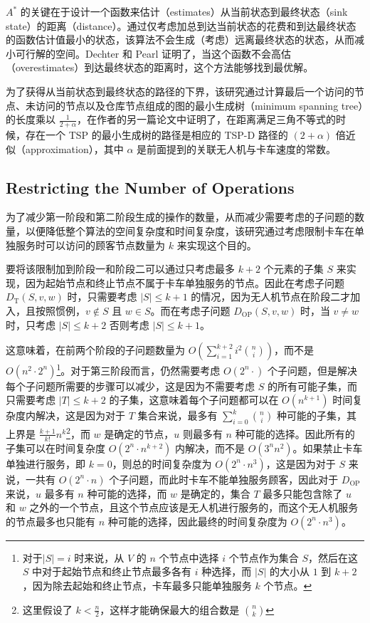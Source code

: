 \documentclass[fontset=none]{ctexart}
\begin{document}
$A^*$ 的关键在于设计一个函数来估计（estimates）从当前状态到最终状态（sink state）的距离（distance）。通过仅考虑加总到达当前状态的花费和到达最终状态的函数估计值最小的状态，该算法不会生成（考虑）远离最终状态的状态，从而减小可行解的空间。Dechter 和 Pearl \cite{dechterGeneralizedBestfirstSearch1985}证明了，当这个函数不会高估（overestimates）到达最终状态的距离时，这个方法能够找到最优解。

为了获得从当前状态到最终状态的路径的下界，该研究通过计算最后一个访问的节点、未访问的节点以及仓库节点组成的图的最小生成树（minimum spanning tree）的长度乘以 $\frac{1}{2 + \alpha}$，在作者的另一篇论文\cite{agatzOptimizationApproachesTraveling2018}中证明了，在距离满足三角不等式的时候，存在一个 TSP 的最小生成树的路径是相应的 TSP-D 路径的 $(2 + \alpha)$ 倍近似（approximation），其中 $\alpha$ 是前面提到的关联无人机与卡车速度的常数。

\subsection{Restricting the Number of Operations}

为了减少第一阶段和第二阶段生成的操作的数量，从而减少需要考虑的子问题的数量，以便降低整个算法的空间复杂度和时间复杂度，该研究通过考虑限制卡车在单独服务时可以访问的顾客节点数量为 $k$ 来实现这个目的。

要将该限制加到阶段一和阶段二可以通过只考虑最多 $k + 2$ 个元素的子集 $S$ 来实现，因为起始节点和终止节点不属于卡车单独服务的节点。因此在考虑子问题 $D_{\text{T}}(S, v, w)$ 时，只需要考虑 $\lvert S \rvert \leq k + 1$ 的情况，因为无人机节点在阶段二才加入，且按照惯例，$v \notin S$ 且 $w \in S$。而在考虑子问题 $D_{\text{OP}}(S, v, w)$ 时，当 $v \neq w$ 时，只考虑 $\lvert S \rvert \leq k + 2$ 否则考虑 $\lvert S \rvert \leq k + 1$。

这意味着，在前两个阶段的子问题数量为 $O\left(\sum_{i = 1}^{k + 2}i^2\binom{n}{i}\right)$，而不是 $O\left(n^2\cdot 2^n\right)$\footnote{对于$\lvert S \rvert = i$ 时来说，从 $V$ 的 $n$  个节点中选择 $i$  个节点作为集合 $S$，然后在这 $S$ 中对于起始节点和终止节点最多各有 $i$ 种选择，而 $\lvert S \rvert$  的大小从 $1$ 到 $k + 2$，因为除去起始和终止节点，卡车最多只能单独服务 $k$ 个节点。}。对于第三阶段而言，仍然需要考虑 $O\left(2^n\cdot\right)$ 个子问题，但是解决每个子问题所需要的步骤可以减少，这是因为不需要考虑 $S$ 的所有可能子集，而只需要考虑 $\lvert T \rvert \leq k + 2$ 的子集，这意味着每个子问题都可以在 $O\left(n^{k+1}\right)$ 时间复杂度内解决，这是因为对于 $T$ 集合来说，最多有 $\sum_{i = 0}^k\binom{n}{i}$ 种可能的子集，其上界是 $\frac{k + 1}{k!}n^k$\footnote{这里假设了 $k < \frac{n}{2}$，这样才能确保最大的组合数是 $\binom{n}{k}$}，而 $w$ 是确定的节点，$u$ 则最多有 $n$ 种可能的选择。因此所有的子集可以在时间复杂度 $O\left(2^n\cdot n^{k + 2}\right)$ 内解决，而不是 $O\left(3^nn^2\right)$。如果禁止卡车单独进行服务，即 $k = 0$，则总的时间复杂度为 $O\left(2^n \cdot n^3\right)$，这是因为对于 $S$ 来说，一共有 $O\left(2^n\cdot n\right)$  个子问题，而此时卡车不能单独服务顾客，因此对于 $D_{\text{OP}}$ 来说，$u$ 最多有 $n$ 种可能的选择，而 $w$ 是确定的，集合 $T$ 最多只能包含除了 $u$ 和 $w$ 之外的一个节点，且这个节点应该是无人机进行服务的，而这个无人机服务的节点最多也只能有 $n$  种可能的选择，因此最终的时间复杂度为 $O\left(2^n\cdot n^3\right)$。
\end{document}

